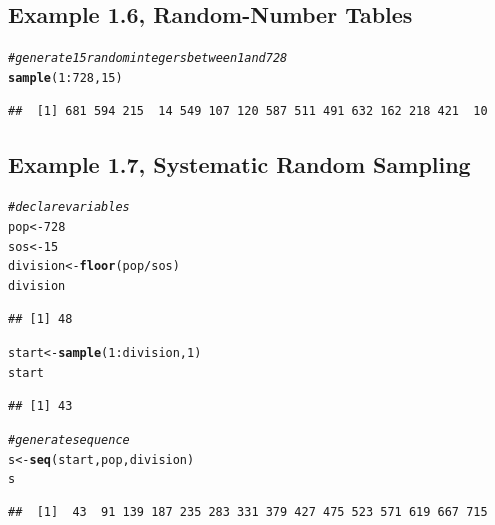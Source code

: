 \documentclass{article}\usepackage[]{graphicx}\usepackage[]{color}
\makeatletter
\newcommand{\hlnum}[1]{\textcolor[rgb]{0.686,0.059,0.569}{#1}}%
\newcommand{\hlcom}[1]{\textcolor[rgb]{0.678,0.584,0.686}{\textit{#1}}}%
\newcommand{\hlopt}[1]{\textcolor[rgb]{0,0,0}{#1}}%
\newcommand{\hlstd}[1]{\textcolor[rgb]{0.345,0.345,0.345}{#1}}%
\newcommand{\hlkwb}[1]{\textcolor[rgb]{0.69,0.353,0.396}{#1}}%
\newcommand{\hlkwd}[1]{\textcolor[rgb]{0.737,0.353,0.396}{\textbf{#1}}}%
\newenvironment{kframe}{%
 \def\at@end@of@kframe{}%
 \ifinner\ifhmode%
  \def\at@end@of@kframe{\end{minipage}}%
  \begin{minipage}{\columnwidth}%
 \fi\fi%
 \def\FrameCommand##1{\hskip\@totalleftmargin \hskip-\fboxsep
 \colorbox{shadecolor}{##1}\hskip-\fboxsep
     \hskip-\linewidth \hskip-\@totalleftmargin \hskip\columnwidth}%
 \MakeFramed {\advance\hsize-\width
   \@totalleftmargin\z@ \linewidth\hsize
   \@setminipage}}%
 {\par\unskip\endMakeFramed%
 \at@end@of@kframe}
\newenvironment{knitrout}{}{} %
\makeatother
\begin{document}
\subsection{Example 1.6, Random-Number Tables}

\begin{knitrout}
\color{fgcolor}\begin{kframe}
\begin{alltt}
\hlcom{#generate 15 random integers between 1 and 728}
\hlkwd{sample}\hlstd{(}\hlnum{1}\hlopt{:}\hlnum{728}\hlstd{,} \hlnum{15}\hlstd{)}
\end{alltt}
\begin{verbatim}
##  [1] 681 594 215  14 549 107 120 587 511 491 632 162 218 421  10
\end{verbatim}
\end{kframe}
\end{knitrout}

\subsection{Example 1.7, Systematic Random Sampling}

\begin{knitrout}
\color{fgcolor}\begin{kframe}
\begin{alltt}
\hlcom{#declare variables}
\hlstd{pop} \hlkwb{<-} \hlnum{728}
\hlstd{sos} \hlkwb{<-} \hlnum{15}
\hlstd{division} \hlkwb{<-} \hlkwd{floor}\hlstd{(pop} \hlopt{/} \hlstd{sos)}
\hlstd{division}
\end{alltt}
\begin{verbatim}
## [1] 48
\end{verbatim}
\begin{alltt}
\hlstd{start} \hlkwb{<-} \hlkwd{sample}\hlstd{(}\hlnum{1}\hlopt{:}\hlstd{division,} \hlnum{1}\hlstd{)}
\hlstd{start}
\end{alltt}
\begin{verbatim}
## [1] 43
\end{verbatim}
\begin{alltt}
\hlcom{#generate sequence}
\hlstd{s} \hlkwb{<-} \hlkwd{seq}\hlstd{(start, pop, division)}
\hlstd{s}
\end{alltt}
\begin{verbatim}
##  [1]  43  91 139 187 235 283 331 379 427 475 523 571 619 667 715
\end{verbatim}
\end{kframe}
\end{knitrout}
\end{document}
